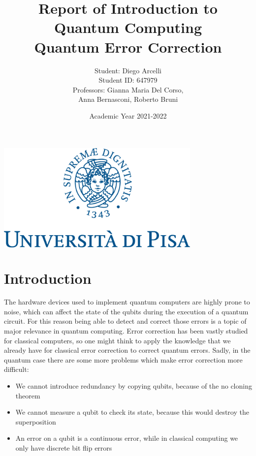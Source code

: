 \documentclass{article}
\begin{document}
	
	\begin{titlepage}
		
		\title{Report of Introduction to Quantum Computing \\ Quantum Error Correction}
		\author{Student: Diego Arcelli\\ Student ID: 647979 \\
			Professors: Gianna Maria Del Corso,\\Anna Bernasconi, Roberto Bruni}
		\date{Academic Year 2021-2022}
		\maketitle
		\centering
		\includegraphics[width=10cm]{./images/unipi_logo.png}
		
	\end{titlepage}
	\newpage
	
	\section{Introduction}
	 
	The hardware devices used to implement quantum computers are highly prone to noise, which can affect the state of the qubits during the execution of a quantum circuit. For this reason being able to detect and correct those errors is a topic of major relevance in quantum computing. Error correction has been vastly studied for classical computers, so one might think to apply the knowledge that we already have for classical error correction to correct quantum errors. Sadly, in the quantum case there are some more problems which make error correction more difficult:
	\begin{itemize}
		\item We cannot introduce redundancy by copying qubits, because of the no cloning theorem
		\item We cannot measure a qubit to check its state, because this would destroy the superposition
		\item An error on a qubit is a continuous error, while in classical computing we only have discrete bit flip errors
	\end{itemize}	
	
\end{document}
